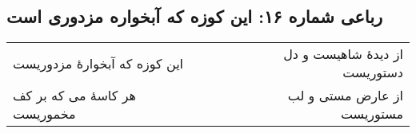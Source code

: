 \begin{center}
\section*{رباعی شماره ۱۶: این کوزه که آبخواره مزدوری است}
\label{sec:sh016}
\begin{longtable}{l p{0.5cm} r}
این کوزه که آبخوارهٔ مزدوریست
&&
از دیدهٔ شاهیست و دل دستوریست
\\
هر کاسهٔ می که بر کف مخموریست
&&
از عارض مستی و لب مستوریست
\\
\end{longtable}
\end{center}
